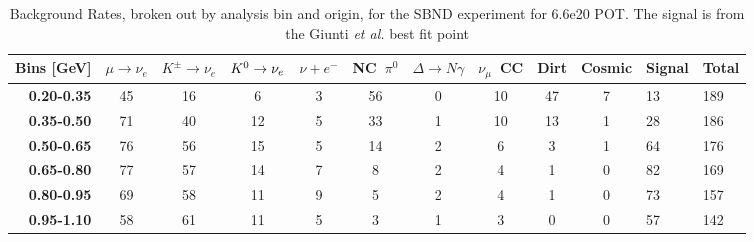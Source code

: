 \begin{table}[]
\centering
\small
\caption{Background Rates, broken out by analysis bin and origin, for the SBND experiment for 6.6e20 POT. The signal is from the Giunti {\em et al.} best fit point}
\label{tab:sbn_event_rates_no_signal}
\begin{tabular}{r|cccccccccll}
\multicolumn{1}{l|}{Bins [GeV]} & \multicolumn{1}{l}{$\mu\rightarrow\nu_e$} & \multicolumn{1}{l}{$K^{\pm}\rightarrow \nu_e$} & \multicolumn{1}{l}{$K^0 \rightarrow \nu_{e}$} & \multicolumn{1}{l}{$\nu + e^-$} & \multicolumn{1}{l}{NC~$\pi^0$} & \multicolumn{1}{l}{$\Delta \rightarrow N\gamma$} & \multicolumn{1}{l}{$\nu_{\mu}$~CC} & \multicolumn{1}{l}{Dirt} & \multicolumn{1}{l}{Cosmic} & Signal               & Total \\ \hline
\textbf{0.20-0.35}    & 45                          & 16                          & 6                           & 3                        & 56                         & 0                          & 10                         & 47                       & 7                          & 13                   & 189   \\
\textbf{0.35-0.50}    & 71                          & 40                          & 12                          & 5                        & 33                         & 1                          & 10                         & 13                       & 1                          & 28                   & 186   \\
\textbf{0.50-0.65}    & 76                          & 56                          & 15                          & 5                        & 14                         & 2                          & 6                          & 3                        & 1                          & 64                   & 176   \\
\textbf{0.65-0.80}    & 77                          & 57                          & 14                          & 7                        & 8                          & 2                          & 4                          & 1                        & 0                          & 82                   & 169   \\
\textbf{0.80-0.95}    & 69                          & 58                          & 11                          & 9                        & 5                          & 2                          & 4                          & 1                        & 0                          & 73                   & 157   \\
\textbf{0.95-1.10}    & 58                          & 61                          & 11                          & 5                        & 3                          & 1                          & 3                          & 0                        & 0                          & 57                   & 142   \\

\end{tabular}
\end{table}
